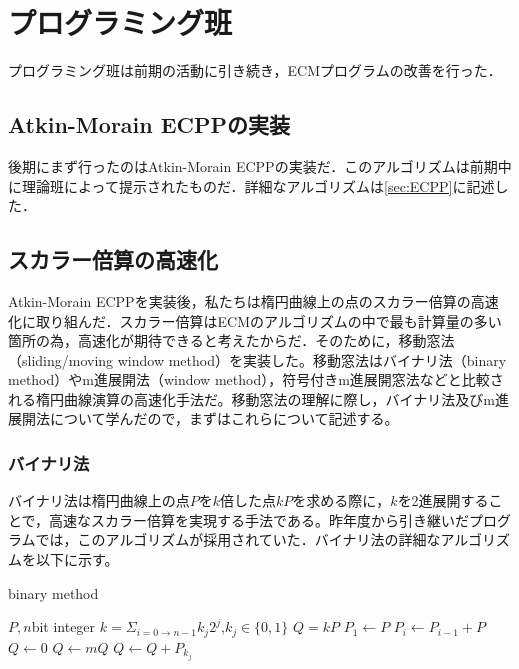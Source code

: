 \documentclass[openany,11pt,papersize]{jsbook}
\begin{document}
\section{プログラミング班}
プログラミング班は前期の活動に引き続き，ECMプログラムの改善を行った．

\subsection{Atkin-Morain ECPPの実装}
後期にまず行ったのはAtkin-Morain ECPPの実装だ．このアルゴリズムは前期中に理論班によって提示されたものだ．詳細なアルゴリズムは\ref{sec:ECPP}に記述した．

\subsection{スカラー倍算の高速化}
Atkin-Morain ECPPを実装後，私たちは楕円曲線上の点のスカラー倍算の高速化に取り組んだ．スカラー倍算はECMのアルゴリズムの中で最も計算量の多い箇所の為，高速化が期待できると考えたからだ．そのために，移動窓法（sliding/moving window method）を実装した。移動窓法はバイナリ法（binary method）やm進展開法（window method），符号付きm進展開窓法などと比較される楕円曲線演算の高速化手法だ。移動窓法の理解に際し，バイナリ法及びm進展開法について学んだので，まずはこれらについて記述する。

\subsubsection{バイナリ法}
バイナリ法は楕円曲線上の点$Pをk倍した点kPを求める際に，k$を2進展開することで，高速なスカラー倍算を実現する手法である。昨年度から引き継いだプログラムでは，このアルゴリズムが採用されていた．バイナリ法の詳細なアルゴリズムを以下に示す。

\begin{algorithm}[H]                   
\caption{binary method}
\label{alg:algB}                          
\begin{algorithmic}                  
\REQUIRE $P, n$bit integer $k = {\displaystyle \Sigma_{i=0 \rightarrow n-1}}k_j 2^j$,$k_j \in \{0,1\}$
\ENSURE $Q = kP$
\STATE $P_1 \leftarrow P$
\STATE $P_i \leftarrow P_{i-1} + P$
\ENDFOR
\STATE $Q \leftarrow 0$
\STATE $Q \leftarrow mQ$
\STATE $Q \leftarrow Q+P_{k_j}$
\ENDFOR
\end{algorithmic}
\end{algorithm}
\end{document}
